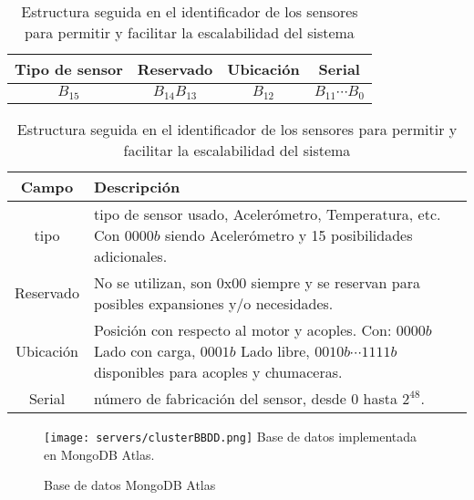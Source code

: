     \begin{table}[ht]
        \begin{center}
        \caption[Estructura IdSensor]{Estructura seguida en el identificador de
        los sensores para permitir y facilitar la escalabilidad del sistema}
        \label{tab:CodIdSensor}

            \vspace{0.3cm}
            \begin{tabular}{|c|c|c|c|}
                \hline
                Tipo de sensor & Reservado& Ubicación   & Serial \\\hline\hline
                $ B_{15} $ & $ B_{14}B_{13} $ &$ B_{12} $  &  $ B_{11}\cdots B_{0} $\\
                \hline
            \end{tabular}

            \vspace{0.3cm}
            \begin{tabular}{|c|p{13cm}|}
                \hline
                Campo       & Descripción
                \\\hline\hline
                tipo        & tipo de sensor usado, Acelerómetro, Temperatura, etc.
                Con $0000b$ siendo Acelerómetro y 15 posibilidades adicionales.
                \\\hline
                Reservado   & No se utilizan, son 0x00 siempre y se reservan para
                posibles expansiones y/o necesidades.
                \\\hline
                Ubicación   & Posición con respecto al motor y acoples. Con:
                $0000b$ Lado con carga, $ 0001b$ Lado libre, $ 0010b\cdots1111b $
                disponibles para acoples y chumaceras.
                \\\hline
                Serial      & número de fabricación del sensor, desde 0 hasta $2^{48}$.
                \\\hline
            \end{tabular}
        \end{center}
    \end{table}

	\begin{figure}[htb]
		\centering
        \caption{Base de datos MongoDB Atlas}
        \texttt{[image: servers/clusterBBDD.png]}
        Base de datos implementada en MongoDB Atlas.    \label{img:clusterBBDD}
	\end{figure}

